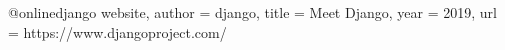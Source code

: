 @online{django website,
author = {django},
title = {Meet Django},
year = {2019},
url = {https://www.djangoproject.com/}
} 